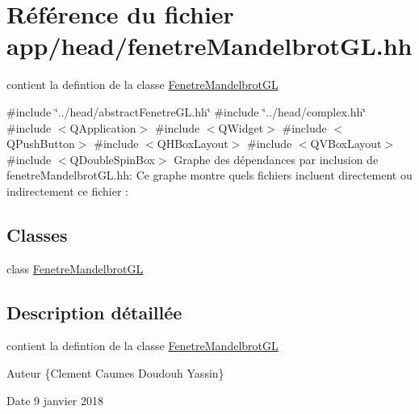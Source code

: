\hypertarget{fenetreMandelbrotGL_8hh}{}\section{Référence du fichier app/head/fenetre\+Mandelbrot\+GL.hh}
\label{fenetreMandelbrotGL_8hh}


contient la defintion de la classe \hyperlink{classFenetreMandelbrotGL}{Fenetre\+Mandelbrot\+GL}  


{\ttfamily \#include \char`\"{}../head/abstract\+Fenetre\+G\+L.\+hh\char`\"{}}\newline
{\ttfamily \#include \char`\"{}../head/complex.\+hh\char`\"{}}\newline
{\ttfamily \#include $<$Q\+Application$>$}\newline
{\ttfamily \#include $<$Q\+Widget$>$}\newline
{\ttfamily \#include $<$Q\+Push\+Button$>$}\newline
{\ttfamily \#include $<$Q\+H\+Box\+Layout$>$}\newline
{\ttfamily \#include $<$Q\+V\+Box\+Layout$>$}\newline
{\ttfamily \#include $<$Q\+Double\+Spin\+Box$>$}\newline
Graphe des dépendances par inclusion de fenetre\+Mandelbrot\+G\+L.\+hh\+:
Ce graphe montre quels fichiers incluent directement ou indirectement ce fichier \+:
\subsection*{Classes}
\begin{DoxyCompactItemize}
\item 
class \hyperlink{classFenetreMandelbrotGL}{Fenetre\+Mandelbrot\+GL}
\end{DoxyCompactItemize}


\subsection{Description détaillée}
contient la defintion de la classe \hyperlink{classFenetreMandelbrotGL}{Fenetre\+Mandelbrot\+GL} 

\begin{DoxyAuthor}{Auteur}
\{Clement Caumes Doudouh Yassin\} 
\end{DoxyAuthor}
\begin{DoxyDate}{Date}
9 janvier 2018 
\end{DoxyDate}
